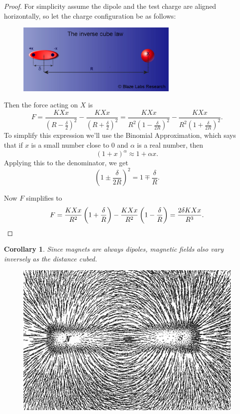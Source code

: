 \documentclass[12pt]{article}
\theoremstyle{plain}
\newtheorem{corollary}[theorem]{Corollary}
\theoremstyle{definition}
\theoremstyle{remark}
\begin{document}
\begin{proof}
For simplicity assume the dipole and the test charge are aligned horizontally, so let the charge configuration be as follows:
\begin{figure}[H]
\centering
\includegraphics[width=0.7\textwidth]{inversecubedipole}
\end{figure}

Then the force acting on $X$ is $$F = \frac{KXx}{(R - \frac{\delta}{2})^2} - \frac{KXx}{(R + \frac{\delta}{2})^2} = \frac{KXx}{R^2(1 - \frac{\delta}{2R})^2} - \frac{KXx}{R^2(1 + \frac{\delta}{2R})^2}.$$
To simplify this expression we'll use the Binomial Approximation, which says that if $x$ is a small number close to 0 and $\alpha$ is a real number, then $$(1 + x)^\alpha \approx 1 + \alpha x.$$
Applying this to the denominator, we get $$\left(1 \pm \frac{\delta}{2R}\right)^{2} = 1 \mp \frac{\delta}{R}.$$

Now $F$ simplifies to $$F = \frac{KXx}{R^2}\left(1 + \frac{\delta}{R}\right) - \frac{KXx}{R^2}\left(1 - \frac{\delta}{R}\right) = \frac{2\delta KXx}{R^3}.\qedhere$$
\end{proof}

\begin{corollary}
Since magnets are always dipoles, magnetic fields also vary inversely as the distance cubed.
\end{corollary}

\begin{figure}[H]
\centering
\includegraphics[width=.7\textwidth]{Magnet0873}
\end{figure}
\end{document}
